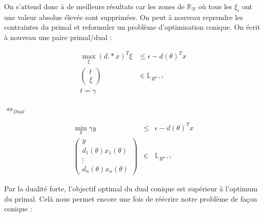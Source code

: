 On s'attend donc à de meilleurs résultats car les zones de $\mathbb{R}_N$ où tous les $\xi_i$ ont une valeur absolue élevée sont supprimées.
On peut à nouveau reprendre les contraintes du primal et reformuler un problème d'optimisation conique. On écrit à nouveau une paire primal/dual :
\begin{center}
\begin{minipage}{0.4\textwidth}
\begin{align*}
\max_{\xi} (d.*x)^T \xi & \leq \epsilon - d(\theta)^Tx \nonumber \\
\begin{pmatrix}t \\ \xi \end{pmatrix} & \in   \mathbb{L}_{R^{n+1}} \nonumber \\ 
t = \gamma \nonumber
\end{align*}
\end{minipage}
$\Leftrightarrow _{Dual}$
\begin{minipage}{0.4\textwidth}
\begin{eqnarray*}
\min_{y} \gamma y & \leq & \epsilon - d(\theta)^Tx \\
\begin{pmatrix}
y \\
d_1(\theta)x_1(\theta) \\
\vdots \\
d_n(\theta)x_n(\theta)
\end{pmatrix}
 & \in & \mathbb{L}_{R^{n+1}}
\end{eqnarray*}
\end{minipage}
\end{center}
Par la dualité forte, l'objectif optimal du dual conique est supérieur à l'optimum du primal. Celà nous permet encore une fois de réécrire notre problème de façon conique :
